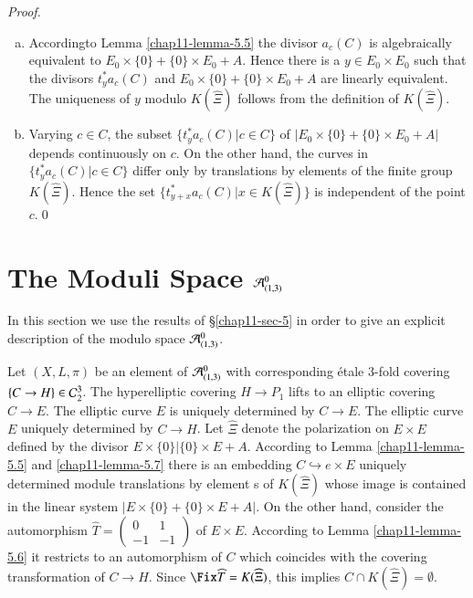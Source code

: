 \medskip
\noindent
{\it Proof.}
\begin{enumerate}[a)]
\item According\pageoriginale to Lemma \ref{chap11-lemma-5.5} the divisor $a_{c}(C)$ is algebraically equivalent to $E_{0} \times \{0\} + \{0\} \times E_{0} + A$. Hence there is a $y \in E_{0} \times E_{0}$ such that the divisors $t_{y}^{*}a_{c}(C)$ and $E_{0} \times \{0\} + \{0\} \times E_{0} +A$ are linearly equivalent. The uniqueness of $y$ modulo $K(\widehat{\Xi})$ follows from the definition of $K(\widehat{\Xi})$.

\item Varying $c \in C$, the subset $\{t_{y}^{*}a_{c}(C) | c\in C\}$ of $|E_{0} \times \{0\} + \{0\} \times E_{0} +A|$
depends continuously on $c$. On the other hand, the curves in $\{t_{y}^{*}a_{c}(C)| c \in C\}$ differ only by translations by elements of the finite group $K(\widehat{\Xi})$. Hence the set $\{t_{y+x}^{*}a_{c}(C) | x \in K(\widehat{\Xi})\}$ is independent of the point $c$.\hfill\qed
\end{enumerate}

\section{The Moduli Space \protect\boldmath$\mathcal{A}^{0}_{(1,3)}$}\label{chap11-sec-6}

In this section we use the results of \S\ref{chap11-sec-5} in order to give an explicit description of the modulo space $\mathcal{A}_{(1,3)}^{0}$. 

Let $(X, L, \pi)$ be an element of $\mathcal{A}_{(1,3)}^{0}$ with corresponding \'etale 3-fold covering $\{ C \rightarrow H \} \in \mathcal{C}_{2}^{3}$. The hyperelliptic covering $H \rightarrow P_{1}$ lifts to an elliptic covering $C \rightarrow E$. The elliptic curve $E$ is uniquely determined by $C\rightarrow E$. The elliptic curve $E$ uniquely determined by $C\rightarrow H$. Let $\widehat{\Xi}$ denote the polarization on $E \times E$ defined by the divisor $E \times \{0\} |\{0\} \times E +A $. According to Lemma \ref{chap11-lemma-5.5} and \ref{chap11-lemma-5.7} there is an embedding $C \hookrightarrow e \times E$ uniquely determined module translations by element s of $K(\widehat{\Xi})$ whose image is contained in the linear system $|E \times \{0\}+ \{0\} \times E + A|$. On the other hand, consider the automorphism $\widehat{T}=\begin{pmatrix}
0 & 1\\
-1 & -1
\end{pmatrix}$ of $E \times E$. According to Lemma \ref{chap11-lemma-5.6} it restricts to an automorphism of $C$ which coincides with the covering transformation of $C\rightarrow H$. Since $\Fix\widehat{T} =K(\widehat{\Xi})$, this implies $C \cap K(\widehat{\Xi})=\emptyset$.

